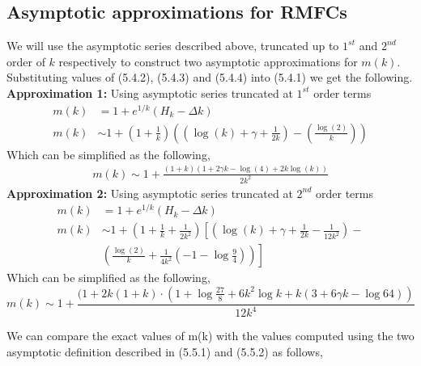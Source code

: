 \documentclass[12pt]{article}
\numberwithin{equation}{section}
\begin{document}
\subsection{Asymptotic approximations for RMFCs}
We will use the asymptotic series described above, truncated up to $1^{st}$ and $2^{nd}$ order of $k$ respectively to construct two asymptotic approximations for $m(k)$. Substituting values of (5.4.2), (5.4.3) and (5.4.4) into (5.4.1) we get the following.\\
\textbf{Approximation 1:} Using asymptotic series truncated at $1^{st}$ order terms
\begin{align*}
    m(k)&=1+e^{1/k}\left( H_k - \Delta k \right)\\
    m(k) &\sim 1+\left( 1+ \frac{1}{k} \right) \left( \left( \log(k) + \gamma + \frac{1}{2k} \right) - \left( \frac{\log(2)}{k} \right) \right)
\end{align*}
Which can be simplified as the following,
\begin{align}
    m(k) \sim 1+ \frac{(1+k)(1+2 \gamma k - \log (4) +2k \log(k))}{2k^2}
\end{align}
\textbf{Approximation 2:} Using asymptotic series truncated at $2^{nd}$ order terms
\begin{equation*}
    \begin{aligned}
    m(k)&=1+e^{1/k}\left( H_k - \Delta k \right)\\
    m(k)& \sim 1+\left(1+\frac{1}{k}+\frac{1}{2 k^2} \right) \left[ \left( \log(k)+\gamma+\frac{1}{2k}-\frac{1}{12k^2} \right) \right.-\\
    &\left. \left( \frac{\log(2)}{k}+\frac{1}{4k^2}\left( -1-\log \frac{9}{4}\right) \right)\right]
\end{aligned}
\end{equation*}
Which can be simplified as the following,
\begin{equation}
    m(k) \sim 1+\frac{(1+2k(1+k)\cdot(1+\log\frac{27}{8}+6k^2 \log k +k(3+6\gamma k-\log 64))}{12k^4}
\end{equation}
\par We can compare the exact values of m(k) with the values computed using the two asymptotic definition described in (5.5.1) and (5.5.2) as follows, 
\end{document}
